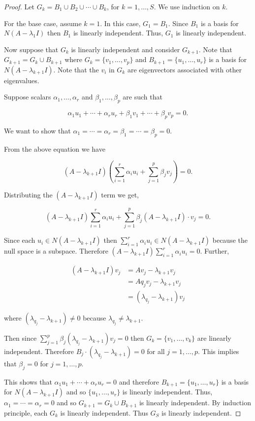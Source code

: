 \documentclass[12pt]{article}
\theoremstyle{definition}
\begin{document}
\begin{proof}
Let $G_k = B_1 \cup B_2 \cup \cdots \cup B_k$, for $k = 1, \ldots, S$. We use induction on $k$.

For the base case, assume $k = 1$. In this case, $G_1 = B_1$. Since $B_1$ is a basis for
$N(A - \lambda_1 I)$ then $B_1$ is linearly independent. Thus, $G_1$ is linearly independent.

Now suppose that $G_k$ is linearly independent and consider $G_{k + 1}$. Note that 
$G_{k + 1} = G_k \cup B_{k + 1}$ where $G_k = \{ v_1, \ldots, v_p \}$ and $B_{k + 1} = \{u_1, \ldots, u_r\}$
is a basis for $N(A - \lambda_{k + 1} I)$. Note that the $v_i$ in $G_k$ are eigenvectors associated with
other eigenvalues.

Suppose scalars $\alpha_1, \ldots, \alpha_r$ and $\beta_1, \ldots, \beta_p$ are such that

\[\alpha_1 u_1 + \cdots + \alpha_r u_r + \beta_1 v_1 + \cdots + \beta_p v_p = 0.\]

We want to show that $\alpha_1 = \cdots = \alpha_r = \beta_1 = \cdots = \beta_p = 0$.

From the above equation we have

\[
(A - \lambda_{k + 1} I) (\sum_{i = 1}^{r} \alpha_i u_i + \sum_{j = 1}^{p} \beta_j v_j) = 0.
\]

Distributing the $(A - \lambda_{k + 1} I)$ term we get,

\[
(A - \lambda_{k + 1} I) \sum_{i = 1}^{r} \alpha_i u_i + \sum_{j = 1}^{p} \beta_j (A - \lambda_{k + 1} I) \cdot v_j = 0.
\]

Since each $u_i \in N(A - \lambda_{k + 1} I)$ then $\sum_{i = 1}^{r} \alpha_i u_i \in N(A - \lambda_{k + 1}I)$ because
the null space is a subspace. Therefore $(A - \lambda_{k + 1} I) \sum_{i = 1}^{r} \alpha_i u_i = 0$. Further,

\begin{align*}
(A - \lambda_{k + 1} I ) v_j &= Av_j - \lambda_{k + 1}v_j \\
&= A q_j v_j - \lambda_{k + 1} v_j \\
&= (\lambda_{q_j} - \lambda_{k + 1})v_j
\end{align*} 

where $(\lambda_{q_j} - \lambda_{k + 1}) \neq 0$ because $\lambda_{q_j} \neq \lambda_{k + 1}$.

Then since $\sum_{j = 1}^p \beta_j (\lambda_{q_j} - \lambda_{k + 1}) v_j = 0$ then
$G_k = \{v_1, \ldots, v_k\}$ are linearly independent. Therefore 
$B_j \cdot (\lambda_{q_j} - \lambda_{k + 1}) = 0$ for all $j = 1, \ldots, p$. This implies
that $\beta_j = 0$ for $j = 1, \ldots, p$.

This shows that $\alpha_1 u_1 + \cdots + \alpha_r u_r = 0$ and therefore
$B_{k + 1} = \{u_1, \ldots, u_r\}$ is a basis for $N(A - \lambda_{k + 1}I)$ and so
$\{u_1, \ldots, u_r\}$ is linearly independent. Thus, $\alpha_1 = \cdots = \alpha_r = 0$ and
so $G_{k + 1} = G_k \cup B_{k + 1}$ is linearly independent. By induction principle,
each $G_k$ is linearly independent. Thus $G_S$ is linearly independent.
\end{proof}
\end{document}
